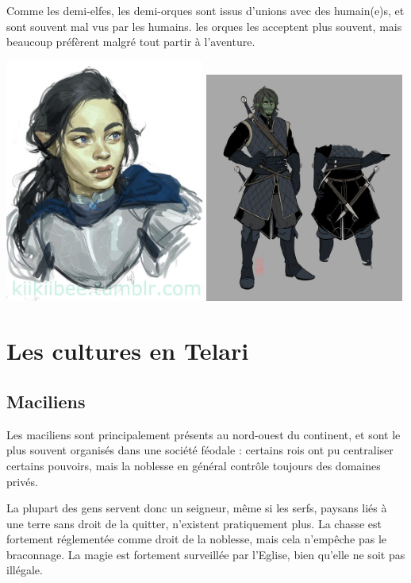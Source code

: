 \documentclass[10pt,a4paper]{book}
\newcommand{\nomorigine}{Telari }
\begin{document}
Comme les demi-elfes, les demi-orques sont issus d'unions avec des humain(e)s, et sont souvent mal vus par les humains. les orques les acceptent plus souvent, mais beaucoup préfèrent malgré tout partir à l'aventure.

\includegraphics[width=0.49\textwidth]{orque 1}
\includegraphics[width=0.49\textwidth]{orque 3}
\section{Les cultures en \nomorigine}
\subsection{Maciliens}
Les maciliens sont principalement présents au nord-ouest du continent, et sont le plus souvent organisés dans une société féodale : certains rois ont pu centraliser certains pouvoirs, mais la noblesse en général contrôle toujours des domaines privés.

La plupart des gens servent donc un seigneur, même si les serfs, paysans liés à une terre sans droit de la quitter, n'existent pratiquement plus. La chasse est fortement réglementée comme droit de la noblesse, mais cela n'empêche pas le braconnage. La magie est fortement surveillée par l'Eglise, bien qu'elle ne soit pas illégale.
\end{document}

